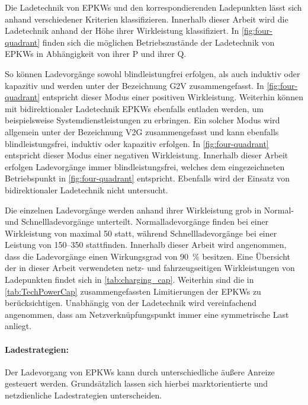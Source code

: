 Die Ladetechnik von \glspl{EPKW} und den korrespondierenden Ladepunkten lässt sich anhand verschiedener Kriterien klassifizieren.
Innerhalb dieser Arbeit wird die Ladetechnik anhand der Höhe ihrer Wirkleistung klassifiziert.
In \autoref{fig:four-quadrant} finden sich die möglichen Betriebszustände der Ladetechnik von \glspl{EPKW} in Abhängigkeit von ihrer \gls{P} und ihrer \gls{Q}.



So können Ladevorgänge sowohl blindleistungfrei erfolgen, als auch induktiv oder kapazitiv und werden unter der Bezeichnung \gls{G2V} zusammengefasst.
In \autoref{fig:four-quadrant} entspricht dieser Modus einer positiven Wirkleistung.
Weiterhin können mit bidirektionaler Ladetechnik \glspl{EPKW} ebenfalls entladen werden, um beispielsweise Systemdienstleistungen zu erbringen.
Ein solcher Modus wird allgemein unter der Bezeichnung \gls{V2G} zusammengefasst und kann ebenfalls blindleistungsfrei, induktiv oder kapazitiv erfolgen.
In \autoref{fig:four-quadrant} entspricht dieser Modus einer negativen Wirkleistung. \cite{He2020} 
Innerhalb dieser Arbeit erfolgen Ladevorgänge immer blindleistungsfrei, welches dem eingezeichneten Betriebspunkt in \autoref{fig:four-quadrant} entspricht.
Ebenfalls wird der Einsatz von bidirektionaler Ladetechnik nicht untersucht.\medskip

Die einzelnen Ladevorgänge werden anhand ihrer Wirkleistung grob in Normal- und Schnellladevorgänge unterteilt.
Normalladevorgänge finden bei einer Wirkleistung von maximal \SI{50}{\kw} statt, während Schnellladevorgänge bei einer Leistung von \SIrange[range-phrase=~{oder}~]{150}{350}{\kw} stattfinden.
Innerhalb dieser Arbeit wird angenommen, dass die Ladevorgänge einen Wirkungsgrad von \SI{90}{\percent} besitzen.
Eine Übersicht der in dieser Arbeit verwendeten netz- und fahrzeugseitigen Wirkleistungen von Ladepunkten findet sich in \autoref{tab:charging_cap}.
Weiterhin sind die in \autoref{tab:TechPowerCap} zusammengefassten Limitierungen der \glspl{EPKW} zu berücksichtigen.
Unabhängig von der Ladetechnik wird vereinfachend angenommen, dass am Netzverknüpfungspunkt immer eine symmetrische Last anliegt.




\paragraph{Ladestrategien:}

Der Ladevorgang von \glspl{EPKW} kann durch unterschiedliche äußere Anreize gesteuert werden.
Grundsätzlich lassen sich hierbei marktorientierte und netzdienliche Ladestrategien unterscheiden.


